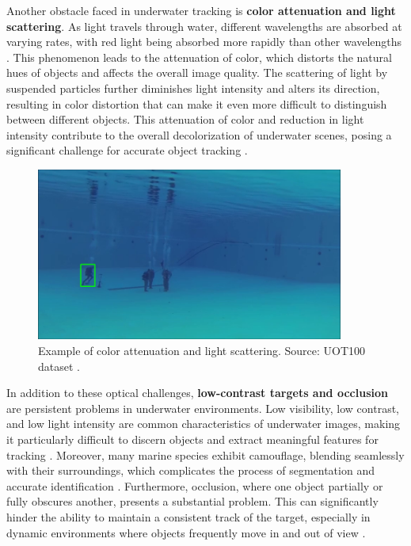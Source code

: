 Another obstacle faced in underwater tracking is \textbf{color attenuation and light scattering}. As light travels through water, different wavelengths are absorbed at varying rates, with red light being absorbed more rapidly than other wavelengths \cite{elmezain2025advancing}. This phenomenon leads to the attenuation of color, which distorts the natural hues of objects and affects the overall image quality. The scattering of light by suspended particles further diminishes light intensity and alters its direction, resulting in color distortion that can make it even more difficult to distinguish between different objects. This attenuation of color and reduction in light intensity contribute to the overall decolorization of underwater scenes, posing a significant challenge for accurate object tracking \cite{elmezain2025advancing, bhadouriaunderwater, rout2019walsh}.
\begin{figure}[ht]
    \centering
    \includegraphics[width=0.9\textwidth]{images/color attenuation and light scattering.png}
    \caption{Example of color attenuation and light scattering. Source: UOT100 dataset \cite{kezebou2019underwater}.}
    \label{fig:color attenuation}
\end{figure}

In addition to these optical challenges, \textbf{low-contrast targets and occlusion} are persistent problems in underwater environments. Low visibility, low contrast, and low light intensity are common characteristics of underwater images, making it particularly difficult to discern objects and extract meaningful features for tracking \cite{zhou2024real, bhadouriaunderwater}. Moreover, many marine species exhibit camouflage, blending seamlessly with their surroundings, which complicates the process of segmentation and accurate identification \cite{elmezain2025advancing}. Furthermore, occlusion, where one object partially or fully obscures another, presents a substantial problem. This can significantly hinder the ability to maintain a consistent track of the target, especially in dynamic environments where objects frequently move in and out of view \cite{zhou2024real, elmezain2025advancing, mathias2022occlusion}.


